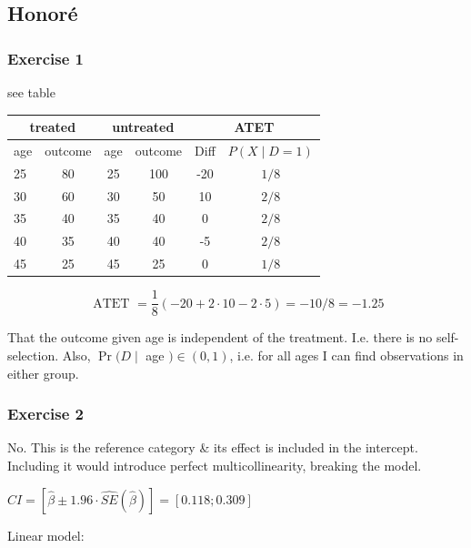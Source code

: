 \newpage
{
\subsection*{Honor\'e}

{
\subsubsection*{Exercise 1}

\begin{enumerate}[label=(\alph*)]
{\item see table

\begin{center}
\begin{tabular}{|l|c|c|c|c|c|}
\hline \multicolumn{2}{|c|}{ treated } & \multicolumn{2}{c|}{ untreated } & \multicolumn{2}{c|}{ ATET } \\
\hline age & outcome & age & outcome & Diff & $P(X \mid D=1)$ \\
\hline 25 & 80 & 25 & 100 & -20 & $1 / 8$ \\
30 & 60 & 30 & 50 & 10 & $2 / 8$ \\
35 & 40 & 35 & 40 & 0 & $2 / 8$ \\
40 & 35 & 40 & 40 & -5 & $2 / 8$ \\
45 & 25 & 45 & 25 & 0 & $1 / 8$ \\
\hline
\end{tabular}
\end{center}

$$
\text { ATET }=\frac{1}{8}(-20+2 \cdot 10-2 \cdot 5)=-10 / 8=-1.25
$$
}
{\item 
That the outcome given age is independent of the treatment. I.e. there is no self-selection. Also, $\operatorname{Pr}(D \mid$ age $) \in(0,1)$, i.e. for all ages I can find observations in either group.
}
\end{enumerate}
}
{
\subsubsection*{Exercise 2}

\begin{enumerate}[label=(\alph*)]
{\item 
No. This is the reference category \& its effect is included in the intercept. Including it would introduce perfect multicollinearity, breaking the model.
}
{\item 
$C I=[\hat{\beta} \pm 1.96 \cdot \hat{S E}(\hat{\beta})]=[0.118 ; 0.309]$
}
{\item 
Linear model:

}
\end{enumerate}}}
